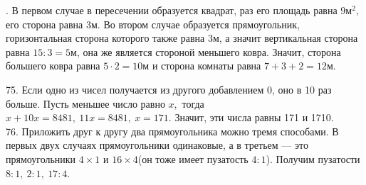 \documentclass[12pt]{article}
\begin{document}
\begin{center}
\begin{figure}[ht!]
\end{figure}
\end{center}
\newpage
{}. В первом случае в пересечении образуется квадрат, раз его площадь равна $9\text{м}^2,$ его сторона равна 3м. Во втором случае образуется прямоугольник, горизонтальная сторона которого также равна 3м, а значит вертикальная сторона равна $15:3=5$м, она же является стороной меньшего ковра. Значит, сторона большего ковра равна $5\cdot2=10$м и сторона комнаты равна $7+3+2=12$м.
\begin{center}
\begin{figure}[ht!]
\end{figure}
\end{center}
75. Если одно из чисел получается из другого добавлением 0, оно в 10 раз больше. Пусть меньшее число равно $x,$ тогда $x+10x=8481,\ 11x=8481,\ x=171.$ Значит, эти числа равны 171 и 1710.\\
76. Приложить друг к другу два прямоугольника можно тремя способами. В первых двух случаях прямоугольники одинаковые, а в третьем --- это прямоугольники $4\times1$ и $16\times4$(он тоже имеет пузатость $4:1$). Получим пузатости $8:1,\ 2:1,\ 17:4.$
\end{document}

